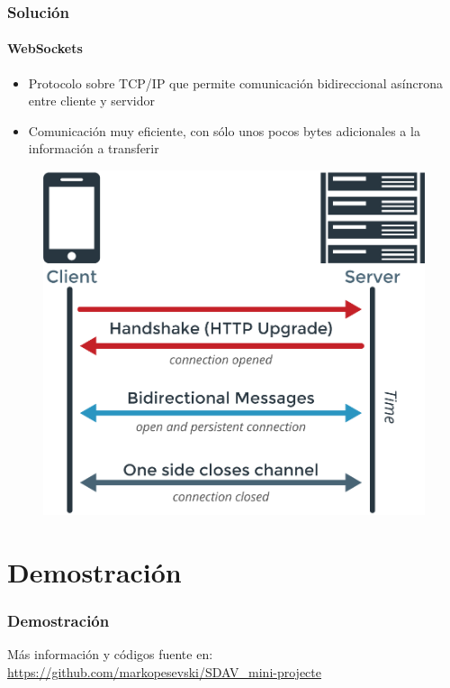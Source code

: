 \documentclass[compress]{beamer}
\begin{document}
		\begin{frame}
			\frametitle{Soluci\'on}
			\framesubtitle{WebSockets}
				\begin{itemize}
					\item
					{

						Protocolo sobre TCP/IP que permite comunicaci\'on bidireccional as\'incrona entre cliente y servidor

					}
					\item
					{

						Comunicaci\'on muy eficiente, con s\'olo unos pocos bytes adicionales a la informaci\'on a transferir

					}
				\end{itemize}
				\begin{figure}
					\includegraphics[keepaspectratio = true, totalheight=0.5\textheight]{figuras/ws_diagrama.png}
				\end{figure}
 		\end{frame}

\section{Demostraci\'on}
		\begin{frame}
			\frametitle{Demostraci\'on}
			\vfill
			M\'as informaci\'on y c\'odigos fuente en:
			\url{https://github.com/markopesevski/SDAV_mini-projecte}
			\vfill
 		\end{frame}
\end{document}
